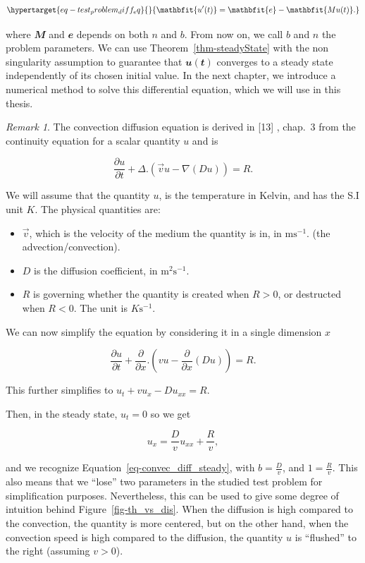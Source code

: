 \documentclass[
  letterpaper,
]{report}
\providecommand{\tightlist}{%
  \setlength{\itemsep}{0pt}\setlength{\parskip}{0pt}}\usepackage{longtable,booktabs,array}
\theoremstyle{plain}
\theoremstyle{definition}
\theoremstyle{definition}
\theoremstyle{remark}
\newtheorem*{remark}{Remark}
\begin{document}
\begin{equation}\protect\hypertarget{eq-test_problem_diff_eq}{}{
\mathbfit{u'(t)} = \mathbfit{e} - \mathbfit{Mu(t)}.
}\label{eq-test_problem_diff_eq}\end{equation}

where \(\mathbfit{M}\) and \(\mathbfit{e}\) depends on both \(n\) and
\(b\). From now on, we call \(b\) and \(n\) the problem parameters. We
can use Theorem~\ref{thm-steadyState} with the non singularity
assumption to guarantee that \(\mathbfit{u(t)}\) converges to a steady
state independently of its chosen initial value. In the next chapter, we
introduce a numerical method to solve this differential equation, which
we will use in this thesis.

\begin{remark}

The convection diffusion equation is derived in {[}13{]} , chap.~3 from
the continuity equation for a scalar quantity \(u\) and is

\[
\frac{\partial u}{\partial t} + \Delta.(\vec{v}u - \nabla(Du)) = R.
\]

We will assume that the quantity \(u\), is the temperature in Kelvin,
and has the S.I unit \(K\). The physical quantities are:

\begin{itemize}
\tightlist
\item
  \(\vec{v}\), which is the velocity of the medium the quantity is in,
  in \(\text{ms}^{-1}\). (the advection/convection).
\item
  \(D\) is the diffusion coefficient, in \(\text{m}^2\text{s}^{-1}\).
\item
  \(R\) is governing whether the quantity is created when \(R>0\), or
  destructed when \(R<0\). The unit is \(K\text{s}^{-1}\).
\end{itemize}

We can now simplify the equation by considering it in a single dimension
\(x\)

\[
\frac{\partial u}{\partial t} + \frac{\partial}{\partial x}.(vu - \frac{\partial}{\partial x}(Du)) = R.
\]

This further simplifies to \(u_t + vu_x - Du_{xx} = R\).

Then, in the steady state, \(u_t = 0\) so we get

\[
u_x = \frac{D}{v}u_{xx} + \frac{R}{v},
\]

and we recognize Equation~\ref{eq-convec_diff_steady}, with
\(b = \frac{D}{v}\), and \(1 = \frac{R}{v}\). This also means that we
``lose'' two parameters in the studied test problem for simplification
purposes. Nevertheless, this can be used to give some degree of
intuition behind Figure~\ref{fig-th_vs_dis}. When the diffusion is high
compared to the convection, the quantity is more centered, but on the
other hand, when the convection speed is high compared to the diffusion,
the quantity \(u\) is ``flushed'' to the right (assuming \(v>0\)).

\end{remark}
\end{document}
